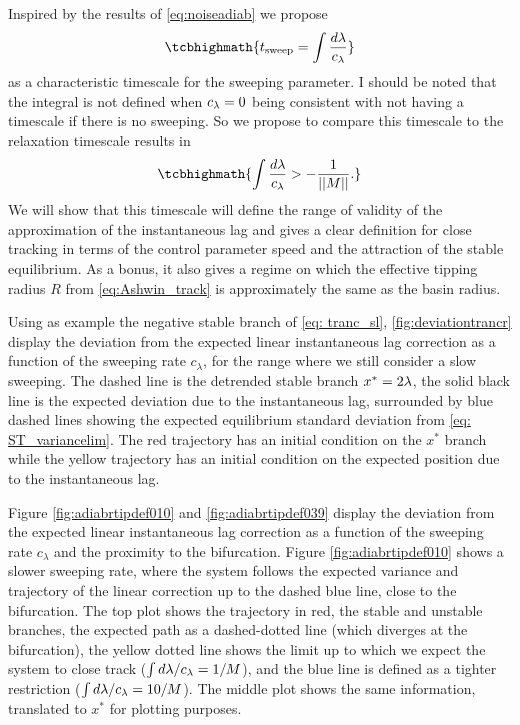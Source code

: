 Inspired by the results of \cref{eq:noiseadiab} we propose
\begin{equation}
		\tcbhighmath{
	t_{\mathrm{sweep}}=\int \frac{d\lambda}{c_\lambda} 
}
\end{equation}
as a characteristic timescale for the sweeping parameter. I should be noted that the integral is not defined when $c_\lambda=0$ being consistent with not having a timescale if there is no sweeping.
So we propose to compare this timescale  to the relaxation timescale results in  
\begin{equation}
		\tcbhighmath{
	\int  \frac{d\la}{c_\la} > -\frac{1}{||M||}.}
\end{equation}
We will show that this timescale will define the range of validity of the approximation of the instantaneous lag and gives a clear definition for close tracking in terms of the control parameter speed and the attraction of the stable equilibrium. 
As a bonus, it also gives a regime on which the  effective tipping radius $R$ from \cref{eq:Ashwin_track} is approximately the same as the basin radius.

Using as example the negative stable branch of \cref{eq: tranc_sl}, \cref{fig:deviationtrancr} display the deviation from the expected linear instantaneous lag correction as a function of the sweeping rate $c_\lambda$, for the range where we still consider a slow sweeping. The dashed line is the detrended stable branch $x^*=2\lambda$, the solid black line is the expected deviation due to the instantaneous lag, surrounded by blue dashed lines showing the expected equilibrium standard deviation from \cref{eq: ST_variancelim}. The red trajectory has an initial condition on the $x^*$ branch while the yellow trajectory has an initial condition on the expected position due to the instantaneous lag.



Figure  \ref{fig:adiabrtipdef010} and \cref{fig:adiabrtipdef039} display the deviation from the expected linear instantaneous lag correction as a function of the sweeping rate $c_\lambda$ and the proximity to the bifurcation. 
Figure \ref{fig:adiabrtipdef010} shows a slower sweeping rate, where the system follows the expected variance and trajectory of the linear correction up to the dashed blue line, close to the bifurcation. 
The top plot shows the trajectory in red, the stable and unstable branches, the expected path as a  dashed-dotted line (which diverges at the bifurcation), the yellow dotted line shows the limit up to which we expect the system to close track ($\int d\lambda/c_\lambda =1/M$), and the blue line  is defined as a tighter restriction ($\int d\lambda/c_\lambda =10/M$).
The middle plot shows the same information, translated to $x^*$ for plotting purposes. 



